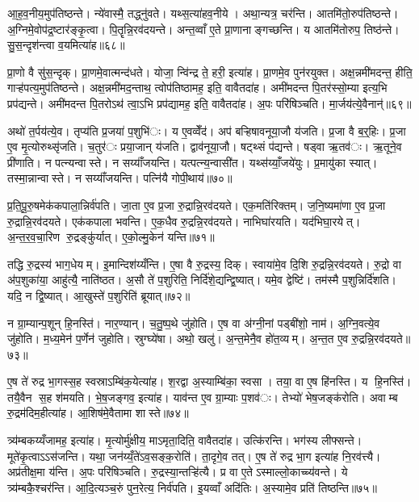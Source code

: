 आ॒ह॒व॒नीय॒मुप॑तिष्ठन्ते। न्ये॑वास्मै॒ तद्ध्नु॑वते। यथ्स॒त्या॑हव॒नीये। अथा॒न्यत्र॒ चर॑न्ति। आतमि॑तो॒रुप॑तिष्ठन्ते। अ॒ग्निमे॒वोप॑द्र॒ष्टार॑ङ्कृ॒त्वा। पि॒तॄन्नि॒रव॑दयन्ते। अन्त॒व्वाँ ए॒ते प्रा॒णानाङ्गच्छन्ति। य आतमि॑तोरुप॒ तिष्ठ॑न्ते। सु॒स॒न्दृश॑न्त्वा व॒यमित्या॑ह॥६८॥

प्रा॒णो वै सु॑स॒न्दृक्। प्रा॒णमे॒वात्मन्द॑धते। योजा॒ न्वि॑न्द्र ते॒ हरी॒ इत्या॑ह। प्रा॒णमे॒व पुन॑रयुक्त। अक्ष॒न्नमी॑मदन्त॒ हीति॒ गाऱ्ह॑पत्य॒मुप॑तिष्ठन्ते। अक्ष॒न्नमी॑मद॒न्ताथ॒ त्वोप॑तिष्ठामह॒ इति॒ वावैतदा॑ह। अमी॑मदन्त पि॒तर॑स्सो॒म्या इत्य॒भि प्रप॑द्यन्ते। अमी॑मदन्त पि॒तरोऽथ॑ त्वा॒ऽभि प्रप॑द्यामह॒ इति॒ वावैतदा॑ह। अ॒पः परि॑षिञ्चति। मा॒र्जय॑त्ये॒वैनान्॑॥६९॥

अथो॑ त॒र्पय॑त्ये॒व। तृप्य॑ति प्र॒जया॑ प॒शुभि॑ः। य ए॒वव्वेँद॑। अप॑ बऱ्हिषावनूया॒जौ य॑जति। प्र॒जा वै ब॒र्॒हिः। प्र॒जा ए॒व मृ॒त्योरुथ्सृ॑जति। च॒तुर॑ः प्रया॒जान् य॑जति। द्वाव॑नूया॒जौ। षट्थ्सं प॑द्यन्ते। षड्वा ऋ॒तव॑ः। ऋ॒तूने॒व प्री॑णाति। न पत्न्यन्वास्ते। न सय्याँ॑जयन्ति। यत्पत्न्य॒न्वासी॑त। यथ्स॑य्याँ॒जये॑युः। प्र॒मायु॑का स्यात्। तस्मा॒न्नान्वास्ते। न सय्याँ॑जयन्ति। पत्नि॑यै गोपी॒थाय॑॥७०॥


प्र॒ति॒पू॒रु॒षमेक॑कपाला॒न्निर्व॑पति। जा॒ता ए॒व प्र॒जा रु॒द्रान्नि॒रव॑दयते। एक॒मति॑रिक्तम्। ज॒नि॒ष्यमा॑णा ए॒व प्र॒जा रु॒द्रान्नि॒रव॑दयते। एक॑कपाला भवन्ति। ए॒क॒धैव रु॒द्रन्नि॒रव॑दयते। नाभिघा॑रयति। यद॑भिघा॒रयेत्। अ॒न्त॒र॒व॒चा॒रिण रु॒द्रङ्कु॑र्यात्। ए॒को॒ल्मु॒केन॑ यन्ति॥७१॥

तद्धि रु॒द्रस्य॑ भाग॒धेयम्। इ॒मान्दिश॑य्यँन्ति। ए॒षा वै रु॒द्रस्य॒ दिक्। स्वाया॑मे॒व दि॒शि रु॒द्रन्नि॒रव॑दयते। रु॒द्रो वा अ॑प॒शुका॑या॒ आहु॑त्यै॒ नाति॑ष्ठत। अ॒सौ ते॑ प॒शुरिति॒ निर्दि॑शे॒द्यन्द्वि॒ष्यात्। यमे॒व द्वेष्टि॑। तम॑स्मै प॒शुन्निर्दि॑शति। यदि॒ न द्वि॒ष्यात्। आ॒खुस्ते॑ प॒शुरिति॑ ब्रूयात्॥७२॥

न ग्रा॒म्यान्प॒शून् हि॒नस्ति॑। नार॒ण्यान्। च॒तु॒ष्प॒थे जु॑होति। ए॒ष वा अ॑ग्नी॒नां पड्बी॑शो॒ नाम॑। अ॒ग्नि॒वत्ये॒व जु॑होति। म॒ध्य॒मेन॑ प॒र्णेन॑ जुहोति। स्रुग्घ्ये॑षा। अथो॒ खलु॑। अ॒न्त॒मेनै॒व हो॑त॒व्यम्। अ॒न्त॒त ए॒व रु॒द्रन्नि॒रव॑दयते॥७३॥

ए॒ष ते॑ रुद्र भा॒गस्स॒ह स्वस्राऽम्बि॑क॒येत्या॑ह। श॒रद्वा अ॒स्याम्बि॑का॒ स्वसा। तया॒ वा ए॒ष हि॑नस्ति। य हि॒नस्ति॑। तयै॒वैन स॒ह श॑मयति। भे॒ष॒जङ्गव॒ इत्या॑ह। याव॑न्त ए॒व ग्रा॒म्याः प॒शव॑ः। तेभ्यो॑ भेष॒जङ्क॑रोति। अवाम्ब रु॒द्रम॑दिम॒हीत्या॑ह। आ॒शिष॑मे॒वैतामा शास्ते॥७४॥

त्र्य॑म्बकय्यँजामह॒ इत्या॑ह। मृ॒त्योर्मु॑क्षीय॒ माऽमृता॒दिति॒ वावैतदा॑ह। उत्कि॑रन्ति। भग॑स्य लीफ्सन्ते। मूते॑कृ॒त्वाऽऽस॑जन्ति। यथा॒ जन॑य्यँ॒ते॑ऽव॒सङ्क॒रोति॑। ता॒दृगे॒व तत्। ए॒ष ते॑ रुद्र भा॒ग इत्या॑ह नि॒रव॑त्त्यै। अप्र॑तीक्ष॒मा य॑न्ति। अ॒पः परि॑षिञ्चति। रु॒द्रस्या॒न्तऱ्हि॑त्यै। प्र वा ए॒तेऽस्माल्लो॒काच्च्य॑वन्ते। ये त्र्य॑म्बकै॒श्चर॑न्ति। आ॒दि॒त्यञ्च॒रुं पुन॒रेत्य॒ निर्व॑पति। इ॒यव्वाँ अदि॑तिः। अ॒स्यामे॒व प्रति॑ तिष्ठन्ति॥७५॥

